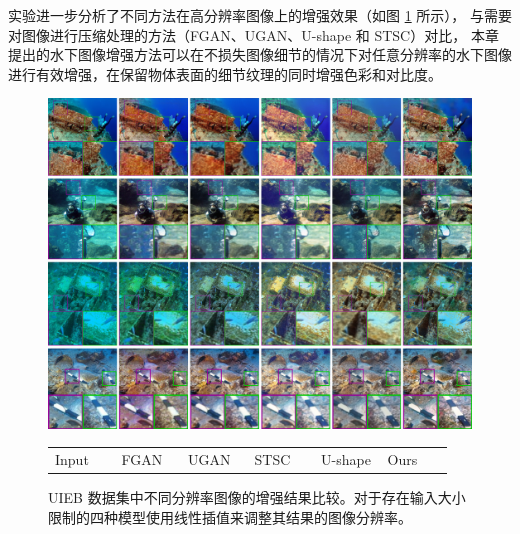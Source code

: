 实验进一步分析了不同方法在高分辨率图像上的增强效果（如图 \ref{img:visual-detail} 所示），
与需要对图像进行压缩处理的方法（FGAN\cite{funie_gan}、UGAN\cite{ugan}、U-shape\cite{u-shape} 和 STSC\cite{stsc}）对比，
本章提出的水下图像增强方法可以在不损失图像细节的情况下对任意分辨率的水下图像进行有效增强，在保留物体表面的细节纹理的同时增强色彩和对比度。

\begin{figure}[ht]
	\begin{center}
        \includegraphics[width=0.96\linewidth]{figures/ch3/compare/discussion/res_detail.jpg}
		\\
        \setlength{\tabcolsep}{0pt} %
        \begin{tabular}{
            >{\centering\arraybackslash}p{0.16\linewidth}
            >{\centering\arraybackslash}p{0.16\linewidth}
            >{\centering\arraybackslash}p{0.16\linewidth}
            >{\centering\arraybackslash}p{0.16\linewidth}
            >{\centering\arraybackslash}p{0.16\linewidth}
            >{\centering\arraybackslash}p{0.16\linewidth}
        }
            \footnotesize Input \hspace{-1.5cm}
			& \footnotesize FGAN\cite{funie_gan} 
			& \footnotesize UGAN\cite{ugan} 
			& \footnotesize STSC\cite{stsc} 
			& \footnotesize U-shape\cite{u-shape} 
			& \footnotesize Ours
            \\ 
		\end{tabular}
	\end{center}
	\caption{ \label{img:visual-detail}UIEB 数据集中不同分辨率图像的增强结果比较。对于存在输入大小限制的四种模型使用线性插值来调整其结果的图像分辨率。}
	\vspace{-2mm}
\end{figure}

